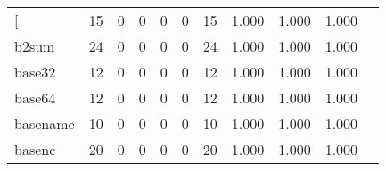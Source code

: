 \begin{longtable}{lp{1.2cm}p{1.2cm}p{1.2cm}p{1.2cm}p{1.2cm}p{1.2cm}p{1.2cm}p{1.2cm}p{1.2cm}p{1.2cm}}
\bottomrule
\endlastfoot
{[}         &                                    15 &                                                  0 &                                                  0 &                                                  0 &                                                  0 &                                                 15 &                                         1.000 &                                              1.000 &                                              1.000 \\
b2sum     &                                    24 &                                                  0 &                                                  0 &                                                  0 &                                                  0 &                                                 24 &                                         1.000 &                                              1.000 &                                              1.000 \\
base32    &                                    12 &                                                  0 &                                                  0 &                                                  0 &                                                  0 &                                                 12 &                                         1.000 &                                              1.000 &                                              1.000 \\
base64    &                                    12 &                                                  0 &                                                  0 &                                                  0 &                                                  0 &                                                 12 &                                         1.000 &                                              1.000 &                                              1.000 \\
basename  &                                    10 &                                                  0 &                                                  0 &                                                  0 &                                                  0 &                                                 10 &                                         1.000 &                                              1.000 &                                              1.000 \\
basenc    &                                    20 &                                                  0 &                                                  0 &                                                  0 &                                                  0 &                                                 20 &                                         1.000 &                                              1.000 &                                              1.000 \\

\end{longtable}
